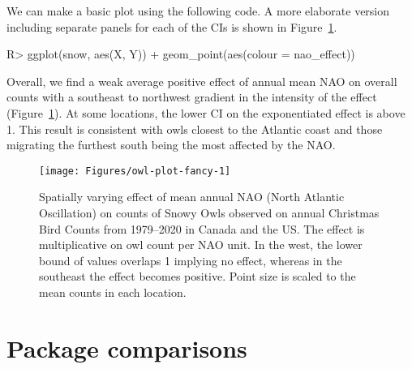 \documentclass[article]{jss}\usepackage[]{graphicx}\usepackage[dvipsnames]{xcolor}
\begin{document}
We can make a basic plot using the following code. A more elaborate version including separate panels for each of the CIs is shown in Figure~\ref{fig:owl-plot-fancy}.

\begin{Schunk}
\begin{Sinput}
R> ggplot(snow, aes(X, Y)) + geom_point(aes(colour = nao_effect))
\end{Sinput}
\end{Schunk}

Overall, we find a weak average positive effect of annual mean NAO on overall counts with a southeast to northwest gradient in the intensity of the effect (Figure~\ref{fig:owl-plot-fancy}).
At some locations, the lower CI on the exponentiated effect is above 1.
This result is consistent with owls closest to the Atlantic coast and those migrating the furthest south being the most affected by the NAO.







\begin{Schunk}
\begin{figure}[htbp]

{\centering \texttt{[image: Figures/owl-plot-fancy-1]} 

}

\caption[Spatially varying effect of mean annual NAO (North Atlantic Oscillation) on counts of Snowy Owls observed on annual Christmas Bird Counts from 1979--2020 in Canada and the US]{Spatially varying effect of mean annual NAO (North Atlantic Oscillation) on counts of Snowy Owls observed on annual Christmas Bird Counts from 1979--2020 in Canada and the US. The effect is multiplicative on owl count per NAO unit. In the west, the lower bound of values overlaps 1 implying no effect, whereas in the southeast the effect becomes positive. Point size is scaled to the mean counts in each location.}\label{fig:owl-plot-fancy}
\end{figure}
\end{Schunk}

\newpage

\section{Package comparisons}\label{package-comparisons}
\end{document}
